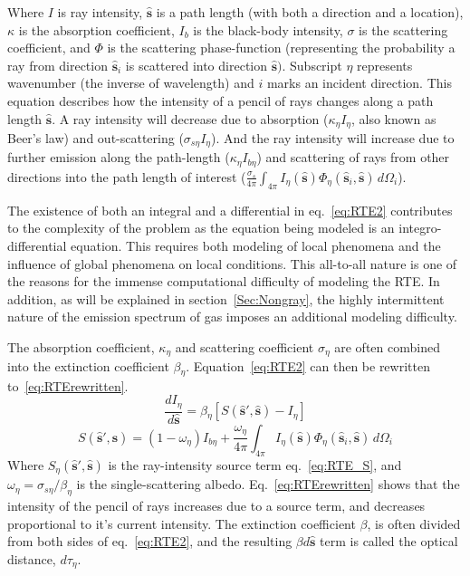 Where $I$ is ray intensity, $\hat{\textbf{s}}$ is a path length (with both a direction and a location), $\kappa{}$ is the absorption coefficient, $I_b$ is the black-body intensity, $\sigma{}$ is the scattering coefficient, and $\Phi{}$ is the scattering phase-function (representing the probability a ray from direction $\hat{\textbf{s}}_i$ is scattered into direction $\hat{\textbf{s}})$. Subscript $\eta{}$ represents wavenumber (the inverse of wavelength) and $i$ marks an incident direction. 
This equation describes how the intensity of a pencil of rays changes along a path length $\hat{\textbf{s}}$. A ray intensity will decrease due to absorption ($\kappa{}_\eta{}I_\eta{}$, also known as Beer's law) and out-scattering ($\sigma{}_{s\eta{}}I_\eta{}$). And the ray intensity will increase due to further emission along the path-length ($\kappa{}_\eta{}I_{b\eta{}}$) and scattering of rays from other directions into the path length of interest ($\frac{\sigma{}_s}{4\pi}\int_{4\pi{}}{I_\eta{}(\hat{\textbf{s}})\Phi_\eta{}(\hat{\textbf{s}}_i,\hat{\textbf{s}})}\,d\Omega{}_i$). 

The existence of both an integral and a differential in eq.~\ref{eq:RTE2} contributes to the complexity of the problem as the equation being modeled is an integro-differential equation. 
This requires both modeling of local phenomena and the influence of global phenomena on local conditions. 
This all-to-all nature is one of the reasons for the immense computational difficulty of modeling the RTE. 
In addition, as will be explained in section~\ref{Sec:Nongray}, the highly intermittent nature of the emission spectrum of gas imposes an additional modeling difficulty.

The absorption coefficient, $\kappa_{\eta{}}$ and scattering coefficient $\sigma{}_\eta{}$ are often combined into the extinction coefficient $\beta{}_\eta{}$. Equation~\ref{eq:RTE2} can then be rewritten to~\ref{eq:RTErewritten}.
\begin{equation}
    \frac{dI_\eta{}}{d\hat{\textbf{s}}} = \beta{}_\eta{}[S(\hat{\textbf{s}}',\hat{\textbf{s}})-I_\eta{}]
    \label{eq:RTErewritten}
\end{equation}
\begin{equation}
    S(\hat{\textbf{s}}',\hat{\textbf{s}}) = (1-\omega{}_\eta{})I_{b\eta{}}+\frac{\omega{}_\eta{}}{4\pi}\int_{4\pi{}}{I_\eta{}(\hat{\textbf{s}})\Phi_\eta{}(\hat{\textbf{s}}_i,\hat{\textbf{s}})}\,d\Omega{}_i
    \label{eq:RTE_S}
\end{equation}
Where $S_\eta{}(\hat{\textbf{s}}',\hat{\textbf{s}})$ is the ray-intensity source term eq.~\ref{eq:RTE_S}, and $\omega{}_\eta{}=\sigma{}_{s\eta{}}/\beta_{\eta{}}$ is the single-scattering albedo. Eq.~\ref{eq:RTErewritten} shows that the intensity of the pencil of rays increases due to a source term, and decreases proportional to it's current intensity.
The extinction coefficient $\beta{}$, is often divided from both sides of eq.~\ref{eq:RTE2}, and the resulting $\beta{}d\hat{\textbf{s}}$ term is called the optical distance, $d\tau{}_\eta{}$.

